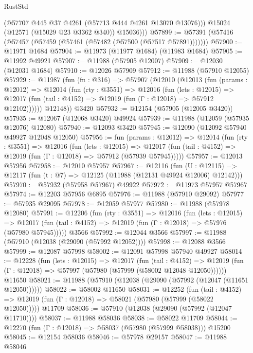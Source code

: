 \begin{lexlean}{RustStd}
\begin{coremodule}
            (@57707 @445 @37 @4261 (@57713 @444 @4261 @13070 @13076)))
          @15024
          (@12571 (@15029 @23 @3362 @340))
          @15036)))
@57899 := @57391 (@57416 (@57457 (@57459 (@57461 (@57482 (@57500 (@57517 @57891)))))))
@57900 := @11971 @1684
@57904 := @11973 (@11977 @1684) (@11983 @1684)
@57905 := @11992 @49921
@57907 := @11988 (@57905 @12007)
@57909 := @12030 (@12031 @1684)
@57910 := @12026 @57909
@57912 := @11988 (@57910 @12055)
@57929 := @11987
    (fun (fn : @316) =>
    @57907
      (@12010
        (@12013
          (fun (params : @12012) =>
          @12014
            (fun (rty : @3551) =>
            @12016
              (fun (lets : @12015) =>
              @12017 (fun (tail : @4152) => @12019 (fun (Γ : @12018) => @57912 @12102))))))
        @12148))
    @3420
@57932 := @12154 (@57905 (@12005 @3420))
@57935 := @12067 (@12068 @3420) @49924
@57939 := @11988 (@12059 (@57935 @12076) @12080)
@57940 := @12093 @3420
@57945 := @12090 (@12092 @57940 @49927 @12048 @12050)
@57956 := fun (params : @12012) =>
  @12014
    (fun (rty : @3551) =>
    @12016
      (fun (lets : @12015) =>
      @12017 (fun (tail : @4152) => @12019 (fun (Γ : @12018) => @57912 (@57939 @57945)))))
@57957 := @12013 @57956
@57958 := @12010 @57957
@57967 := @12116
    (fun (U : @12115) => @12117 (fun (t : @7) => @12125 (@11988 (@12131 @49924 @12006) @12142)))
@57970 := @57932 (@57958 @57967) @49922
@57972 := @11973 @57957 @57967
@57974 := @12203 @57956 @6895
@57976 := @11988 (@57910 @29092)
@57977 := @57935 @29095
@57978 := @12059 @57977
@57980 := @11988 (@57978 @12080)
@57991 := @12206
    (fun (rty : @3551) =>
    @12016
      (fun (lets : @12015) =>
      @12017 (fun (tail : @4152) => @12019 (fun (Γ : @12018) => @57976 (@57980 @57945)))))
    @3566
@57992 := @12044 @3566
@57997 := @11988 (@57910 (@12038 (@29090 (@57992 @12052))))
@57998 := @12088 @3566
@57999 := @12087 @57998
@58002 := @12091 @57998 @57940 @49927
@58014 := @12228
    (fun (lets : @12015) =>
    @12017
      (fun (tail : @4152) =>
      @12019 (fun (Γ : @12018) => @57997 (@57980 (@57999 (@58002 @12048 @12050))))))
    @11650
@58021 := @11988 (@57910 (@12038 (@29090 (@57992 (@12047 (@11651 @12050))))))
@58022 := @58002 @11650
@58031 := @12252
    (fun (tail : @4152) => @12019 (fun (Γ : @12018) => @58021 (@57980 (@57999 (@58022 @12050)))))
    @11709
@58036 := @57910 (@12038 (@29090 (@57992 (@12047 @11710))))
@58037 := @11988 @58036
@58038 := @58022 @11709
@58044 := @12270 (fun (Γ : @12018) => @58037 (@57980 (@57999 @58038))) @15200
@58045 := @12154 @58036
@58046 := @57978 @29157
@58047 := @11988 @58046

\end{coremodule}
\end{lexlean}
